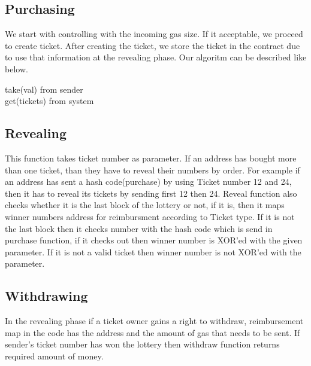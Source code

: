 \documentclass[]{scrreprt}
\begin{document}
		\subsection{Purchasing}
			We start with controlling with the incoming gas size. If it acceptable, we proceed to create ticket. After creating the ticket, we store the ticket in the contract due to use that information at the revealing phase. Our algoritm can be described like below.
			\begin{algorithm}[H]
				take(val) from sender\\
				get(tickets) from system\\
			\end{algorithm}
		\subsection{Revealing}
		This function takes ticket number as parameter. If an address has bought more than one ticket, than they have to reveal their numbers by order. For example if an address has sent a hash code(purchase) by using Ticket number 12 and 24, then it has to reveal its tickets by sending first 12 then 24. Reveal function also checks whether it is the last block of the lottery or not, if it is, then it maps winner numbers address for reimbursment according to Ticket type. If it is not the last block then it checks number with the hash code which is send in purchase function, if it checks out then winner number is XOR'ed with the given parameter. If it is not a valid ticket then winner number is not XOR'ed with the parameter.
		\subsection{Withdrawing}
		In the revealing phase if a ticket owner gains a right to withdraw, reimbursement map in the code has the address and the amount of gas that needs to be sent. If sender's ticket number has won the lottery then withdraw function returns required amount of money. 
\end{document}
